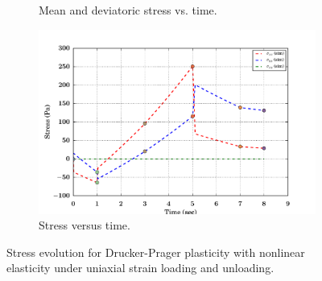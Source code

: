 \begin{figure}[htbp!]
\begin{subfigure}{0.5\textwidth}
    \caption{Mean and deviatoric stress vs. time.}
  \end{subfigure}
  \begin{subfigure}{0.5\textwidth}
    \centering
    \includegraphics[width=\textwidth]{MPMMaterials/FIGS/UniaxialStrainLoadUnloadDPNonLin_sigma_time.pdf}
    \caption{Stress versus time.}
  \end{subfigure}
  \caption{Stress evolution for Drucker-Prager plasticity with nonlinear elasticity under uniaxial strain
           loading and unloading.}
  \label{fig:DPNonLinLoadUnload}
\end{figure}

\newpage
